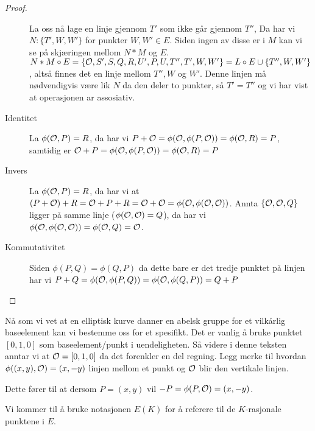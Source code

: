 \begin{teorem}
\begin{proof}
\begin{description}
La oss nå lage en linje gjennom $T'$ som ikke går gjennom $T''$, Da har vi $N: \{T', W, W'\}$ for punkter $W, W' \in E$. Siden ingen av disse er i $M$ kan vi se på skjæringen mellom $N*M$ og $E$. $N*M \circ E = \{\mathcal{O}, S', S, Q, R, U', P, U, T'', T', W, W'  \} = L \circ E \cup \{T'', W, W' \}$, altså finnes det en linje mellom $T'', W$ og $ W'$. Denne linjen må nødvendigvis være lik $N$ da den deler to punkter, så $T' = T''$ og vi har vist at operasjonen ar assosiativ. \cite[5.6.4]{fulton}

\item[Identitet] La $\phi(\mathcal{O}, P) =R $, da har vi $P + \mathcal{O} = \phi(\mathcal{O}, \phi(P, \mathcal{O})) = \phi(\mathcal{O}, R) = P$, samtidig er $\mathcal{O} + P = \phi(\mathcal{O}, \phi(P, \mathcal{O})) = \phi(\mathcal{O}, R) = P$
\item[Invers] La $\phi(\mathcal{O}, P) = R$, da har vi at $(P + \mathcal{O}) + R = \mathcal{O} + P + R = \mathcal{O} + \mathcal{O} = \phi(\mathcal{O}, \phi(\mathcal{O}, \mathcal{O}))$. Annta $\{\mathcal{O}, \mathcal{O}, Q \}$ ligger på samme linje ($\phi(\mathcal{O}, \mathcal{O}) = Q$), da har vi $\phi(\mathcal{O}, \phi(\mathcal{O}, \mathcal{O})) = \phi(\mathcal{O}, Q) = \mathcal{O}$.
\item[Kommutativitet] Siden $\phi(P, Q) = \phi(Q,P)$ da dette bare er det tredje punktet på linjen har vi $P + Q = \phi(\mathcal{O}, \phi(P, Q)) = \phi(\mathcal{O}, \phi(Q,P)) = Q + P$
\end{description}
\end{proof}
\end{teorem}

Nå som vi vet at en elliptisk kurve danner en abelsk gruppe for et vilkårlig baseelement kan vi bestemme oss for et spesifikt. Det er vanlig å bruke punktet $[0,1,0]$ som baseelement/punkt i uendeligheten. Så videre i denne teksten anntar vi at $\mathcal{O} = [0,1,0]$ da det forenkler en del regning. Legg merke til hvordan $\phi((x,y), \mathcal{O}) = (x, -y)$ linjen mellom et punkt og $\mathcal{O}$ blir den vertikale linjen.

Dette fører til at dersom $P = (x,y)$ vil $-P = \phi(P, \mathcal{O}) = (x, -y)$.

Vi kommer til å bruke notasjonen $E(K)$ for å referere til de $K$-rasjonale punktene i $E$.



